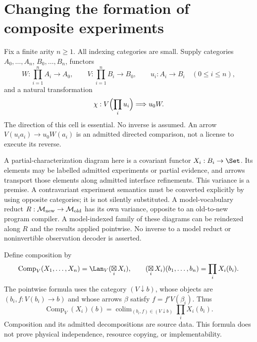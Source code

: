 \section{Changing the formation of composite experiments}\label{sec:decomposition}
Fix a finite arity $n\geq1$. All indexing categories are small. Supply
categories $A_0,\ldots,A_n$, $B_0,\ldots,B_n$, functors
\[
 W:\prod_{i=1}^n A_i\longrightarrow A_0,\qquad
 V:\prod_{i=1}^n B_i\longrightarrow B_0,
 \qquad u_i:A_i\longrightarrow B_i\quad(0\leq i\leq n),
\]
and a natural transformation
\begin{equation}\label{eq:cell}
 \chi:V\Bigl(\prod_i u_i\Bigr)\Longrightarrow u_0W.
\end{equation}
The direction of this cell is essential. No inverse is assumed.
An arrow $V(u_i a_i)\to u_0W(a_i)$ is an admitted directed comparison,
not a license to execute its reverse.

A partial-characterization diagram here is a covariant functor
$X_i:B_i\to\Set$. Its elements may be labelled admitted experiments or
partial evidence, and arrows transport those elements along admitted
interface refinements. This variance is a premise. A contravariant
experiment semantics must be converted explicitly by using opposite
categories; it is not silently substituted. A model-vocabulary reduct
$R:\mathcal M_{\rm new}\to\mathcal M_{\rm old}$ has its own variance,
opposite to an old-to-new program compiler. A model-indexed family of
these diagrams can be reindexed along $R$ and the results applied pointwise.
No inverse to a model reduct or noninvertible observation decoder is
asserted.

Define composition by
\[
 \operatorname{Comp}_V(X_1,\ldots,X_n)
   =\Lan_V(\mathop{\boxtimes}_i X_i),\qquad
 (\mathop{\boxtimes}_iX_i)(b_1,\ldots,b_n)=\prod_iX_i(b_i).
\]
The pointwise formula uses the category $(V\downarrow b)$, whose objects
are $(b_i,f:V(b_i)\to b)$ and whose arrows $\beta$ satisfy
$f=f'V(\beta_i)$. Thus
\[
 \operatorname{Comp}_V(X_i)(b)
   =\mathop{\operatorname{colim}}_{(b_i,f)\in(V\downarrow b)}
            \prod_iX_i(b_i).
\]
Composition and its admitted decompositions are source data. This formula
does not prove physical independence, resource copying, or implementability.


